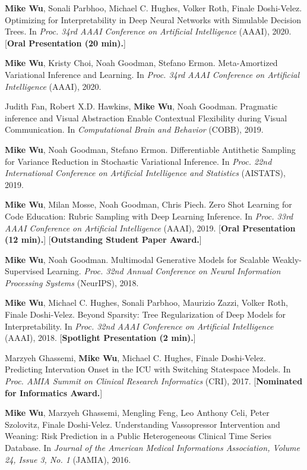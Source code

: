 \documentclass[margin, 10pt]{res} %
\begin{document}
\begin{resume}
\textbf{Mike Wu}, Sonali Parbhoo, Michael C. Hughes, Volker Roth, Finale Doshi-Velez. Optimizing for Interpretability in Deep Neural Networks with Simulable Decision Trees. In \textit{Proc. 34rd AAAI Conference on Artificial Intelligence} (AAAI), 2020. [\textbf{Oral Presentation (20 min).}]

\textbf{Mike Wu}, Kristy Choi, Noah Goodman, Stefano Ermon. Meta-Amortized Variational Inference and Learning. In \textit{Proc. 34rd AAAI Conference on Artificial Intelligence} (AAAI), 2020.

Judith Fan, Robert X.D. Hawkins, \textbf{Mike Wu}, Noah Goodman. Pragmatic inference and Visual Abstraction Enable Contextual Flexibility during Visual Communication. In \textit{Computational Brain and Behavior} (COBB), 2019.

\textbf{Mike Wu}, Noah Goodman, Stefano Ermon. Differentiable Antithetic Sampling for Variance Reduction in Stochastic Variational Inference. In \textit{Proc. 22nd International Conference on Artificial Intelligence and Statistics} (AISTATS), 2019.

\textbf{Mike Wu}, Milan Mosse, Noah Goodman, Chris Piech. Zero Shot Learning for Code Education: Rubric Sampling with Deep Learning Inference. In \textit{Proc. 33rd AAAI Conference on Artificial Intelligence} (AAAI), 2019. [\textbf{Oral Presentation (12 min).}] [\textbf{Outstanding Student Paper Award.}]

\textbf{Mike Wu}, Noah Goodman. Multimodal Generative Models for Scalable Weakly-Supervised Learning. \textit{Proc. 32nd Annual Conference on Neural Information Processing Systems} (NeurIPS), 2018.

\textbf{Mike Wu}, Michael C. Hughes, Sonali Parbhoo, Maurizio Zazzi, Volker Roth, Finale Doshi-Velez. Beyond Sparsity: Tree Regularization of Deep Models for Interpretability. In \textit{Proc. 32nd AAAI Conference on Artificial Intelligence} (AAAI), 2018. [\textbf{Spotlight Presentation (2 min).}]

Marzyeh Ghassemi, \textbf{Mike Wu}, Michael C. Hughes, Finale Doshi-Velez. Predicting Intervation Onset in the ICU with Switching Statespace Models. In \textit{Proc. AMIA Summit on Clinical Research Informatics} (CRI), 2017. [\textbf{Nominated for Informatics Award.}]

\textbf{Mike Wu}, Marzyeh Ghassemi, Mengling Feng, Leo Anthony Celi, Peter Szolovitz, Finale Doshi-Velez. Understanding Vassopressor Intervention and Weaning: Risk Prediction in a Public Heterogeneous Clinical Time Series Database. In \textit{Journal of the American Medical Informations Association, Volume 24, Issue 3, No. 1} (JAMIA), 2016.


\end{resume}
\end{document}
